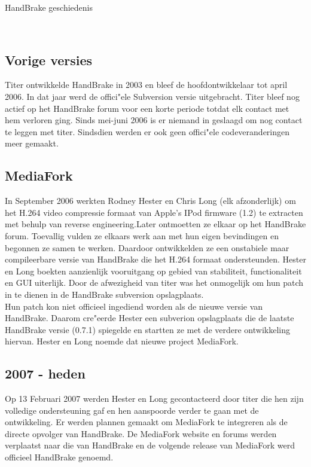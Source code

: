 \label{Hoofdstuk 2}

\begin{sectionbox}{HandBrake geschiedenis}\end{sectionbox}
\ \\[6pt]
\subsection{Vorige versies}

Titer ontwikkelde HandBrake in 2003 en bleef de hoofdontwikkelaar tot april 2006. In dat jaar werd de offici"ele Subversion versie uitgebracht. Titer bleef nog actief op het HandBrake forum voor een korte periode totdat elk contact met hem verloren ging. Sinds mei-juni 2006 is er niemand in geslaagd om nog contact te leggen met titer. Sindsdien werden er ook geen offici"ele codeveranderingen meer gemaakt.

\subsection{MediaFork}

In September 2006 werkten Rodney Hester en Chris Long (elk afzonderlijk) om het H.264 video compressie formaat van Apple's IPod firmware (1.2) te extracten met behulp van reverse engineering.Later ontmoetten ze elkaar op het HandBrake forum. Toevallig vulden ze elkaars werk aan met hun eigen bevindingen en begonnen ze samen te werken. Daardoor ontwikkelden ze een onstabiele maar compileerbare versie van HandBrake die het H.264 formaat ondersteunden. Hester en Long boekten aanzienlijk vooruitgang op gebied van stabiliteit, functionaliteit en GUI uiterlijk. Door de afwezigheid van titer was het onmogelijk om hun patch in te dienen in de HandBrake subversion opslagplaats.\\

Hun patch kon niet officieel ingediend worden als de nieuwe versie van HandBrake. Daarom cre"eerde Hester een subverion opslagplaats die de laatste HandBrake versie (0.7.1) spiegelde en startten ze met de verdere ontwikkeling hiervan. Hester en Long noemde dat nieuwe project MediaFork.

\subsection{2007 - heden}

Op 13 Februari 2007 werden Hester en Long gecontacteerd door titer die hen zijn volledige ondersteuning gaf en hen aanspoorde verder te gaan met de ontwikkeling. Er werden plannen gemaakt om MediaFork te integreren als de directe opvolger van HandBrake. De MediaFork website en forums werden verplaatst naar die van HandBrake en de volgende release van MediaFork werd officieel HandBrake genoemd.\\[24pt]

